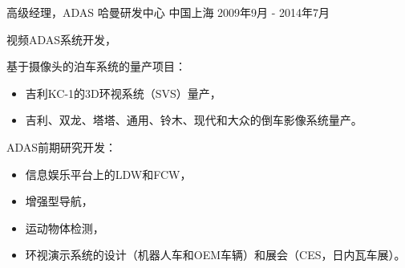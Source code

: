\documentclass[../cv_xin_cn.tex]{subfiles}
\begin{document}
\begin{cventries}
  \cventry
    {高级经理，ADAS} %
    {哈曼研发中心} %
    {中国上海} %
    {2009年9月 - 2014年7月} %
    {
      \begin{cvitems}
        \item 视频ADAS系统开发，
        \item 基于摄像头的泊车系统的量产项目：
          \begin{itemize}
            \item 吉利KC-1的3D环视系统（SVS）量产，
            \item 吉利、双龙、塔塔、通用、铃木、现代和大众的倒车影像系统量产。
           \end{itemize}
        \item ADAS前期研究开发：
          \begin{itemize}
            \item 信息娱乐平台上的LDW和FCW，
            \item 增强型导航，
            \item 运动物体检测，
            \item 环视演示系统的设计（机器人车和OEM车辆）和展会（CES，日内瓦车展）。
          \end{itemize}
      \end{cvitems}
    }
\end{cventries}
\end{document}
